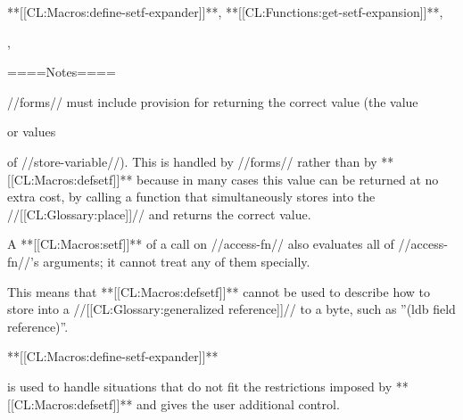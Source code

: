 **[[CL:Macros:define-setf-expander]]**, **[[CL:Functions:get-setf-expansion]]**,

{\secref\GeneralizedReference}, {\secref\DocVsDecls}

====Notes====

//forms// must include provision for returning the correct value (the value

or values

of //store-variable//). This is handled by //forms// rather than by **[[CL:Macros:defsetf]]** because in many cases this value can be returned at no extra cost, by calling a function that simultaneously stores into the //[[CL:Glossary:place]]// and returns the correct value.

A **[[CL:Macros:setf]]** of a call on //access-fn// also evaluates all of //access-fn//'s arguments; it cannot treat any of them specially.

This means that **[[CL:Macros:defsetf]]** cannot be used to describe how to store into a //[[CL:Glossary:generalized reference]]// to a byte, such as ''(ldb field reference)''.

**[[CL:Macros:define-setf-expander]]**

is used to handle situations that do not fit the restrictions imposed by **[[CL:Macros:defsetf]]** and gives the user additional control.

        
